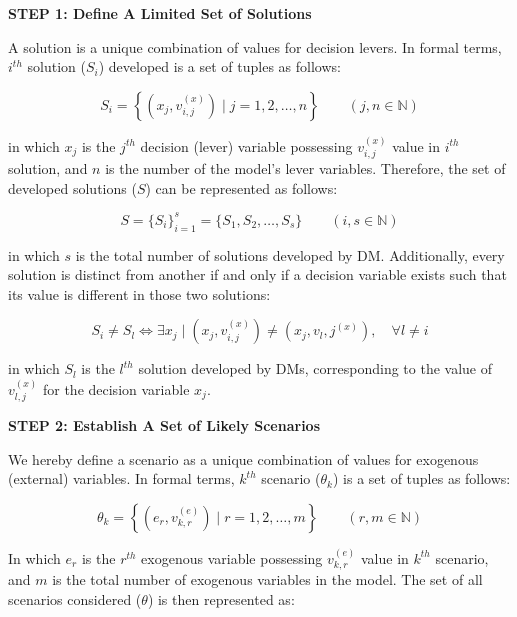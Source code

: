 \documentclass{sfuthesis}
\begin{document}
\textbf{STEP 1: Define A Limited Set of Solutions}

A solution is a unique combination of values for decision levers. In formal terms,
$i^{th}$ solution ($S_i$) developed is a set of tuples as follows:

\begin{equation}
S_i=\left\{(x_j,v_{i,j}^{(x)}) \mid j=1,2,\ldots,n\right\}
\qquad (j,n\in\mathbb{N})
\end{equation}

in which $x_j$ is the $j^{th}$ decision (lever) variable possessing $v_{i,j}^{(x)}$ value in $i^{th}$ solution, and $n$ is the number of the model's lever variables. Therefore, the set of developed solutions ($S$) can be represented as follows:

\begin{equation}
S=\{S_i\}_{i=1}^{s}
=\{S_1,S_2,\ldots,S_s\}
\qquad (i,s\in\mathbb{N})
\end{equation}

in which $s$ is the total number of solutions developed by DM. Additionally, every solution is distinct from another if and only if a decision variable exists such that its value is different in those two solutions:

\begin{equation}
S_i \neq S_l
\iff
\exists x_j
\;\Big|\;
(x_j,v_{i,j}^{(x)})
\neq
(x_j,{v_l,j}^{(x)}),
\quad \forall l \neq i
\end{equation}

in which $S_l$ is the $l^{th}$ solution developed by DMs, corresponding to the value of $v_{l,j}^{(x)}$ for the decision variable $x_j$.\par

\textbf{STEP 2: Establish A Set of Likely Scenarios}

We hereby define a scenario as a unique combination of values for exogenous
(external) variables. In formal terms, $k^{th}$ scenario ($\theta_k$) is a set
of tuples as follows:

\begin{equation}
\theta_k=
\left\{
(e_r,v_{k,r}^{(e)})
\mid r=1,2,\ldots,m
\right\}
\qquad (r,m\in\mathbb{N})
\end{equation}

In which $e_r$ is the $r^{th}$ exogenous variable possessing $v_{k,r}^{(e)}$ value in $k^{th}$ scenario, and $m$ is the total number of exogenous variables in the model. The set of all scenarios considered ($\theta$) is then represented as:
\end{document}
